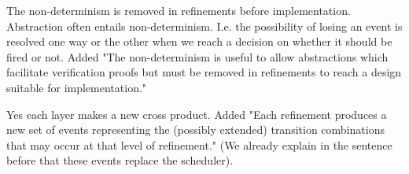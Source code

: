 \documentclass{response}
\begin{document}
\begin{response}
\end{response}

\begin{comment}{Reviewer \#2}
  The current semantics is one of non-determinism as to which events
  will fire in a given microstep.  While this allows refinement, it
  does not admit a deterministic execution strategy, which means that
  it is not currently useful for generation of implementations.  In
  addition, it appears that it is possible that events can be "lost"
  and the system may choose not to execute them.  The authors must
  provide additional justification that this is a sensible semantics;
  I suspect that it will be surprising to most users who are familiar
  with StateCharts.  
 \end{comment}
  
  \begin{response}
	The non-determinism is removed in refinements before implementation. Abstraction often entails non-determinism.
	I.e. the possibility of losing an event is resolved one way or the other when we reach a decision on whether it should be fired or not.
	Added "The non-determinism is useful to allow abstractions which facilitate verification proofs but must be removed in refinements to reach a design suitable for implementation."
  \end{response}

\begin{comment}{Reviewer \#2}  
  When adding transitions at lower layers, it was
  not clear to me how these new transitions fit into the cross-product
  translation used to determine which set of transitions would fire.
  Perhaps this is handled layer-by-layer, but then each layer would
  need a scheduler and this was not discussed.   
\end{comment}

\begin{response}
	Yes each layer makes a new cross product. 
	Added "Each refinement produces a new set of events representing the (possibly extended) transition combinations that may occur at that level of refinement."
	(We already explain in the sentence before that these events replace the scheduler).
\end{response}
\end{document}
